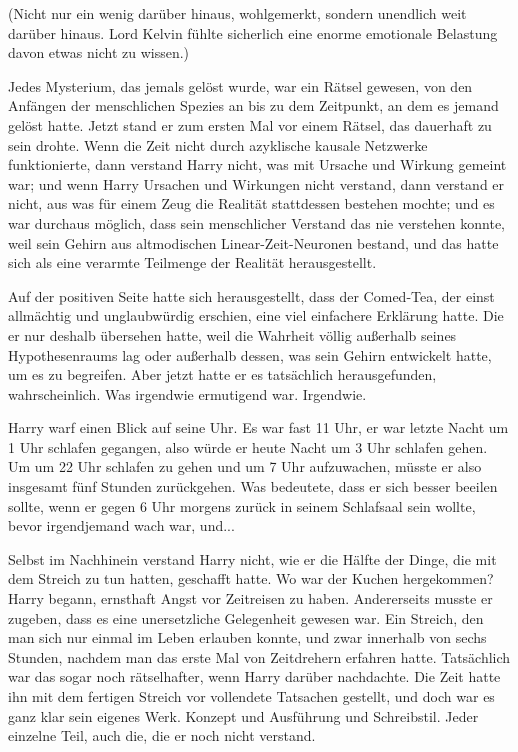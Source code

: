 (Nicht nur ein wenig darüber hinaus, wohlgemerkt, sondern unendlich weit darüber
hinaus. Lord Kelvin fühlte sicherlich eine enorme emotionale Belastung davon
etwas nicht zu wissen.)

Jedes Mysterium, das jemals gelöst wurde, war ein Rätsel gewesen, von den
Anfängen der menschlichen Spezies an bis zu dem Zeitpunkt, an dem es jemand
gelöst hatte. Jetzt stand er zum ersten Mal vor einem Rätsel, das dauerhaft zu
sein drohte. Wenn die Zeit nicht durch azyklische kausale Netzwerke
funktionierte, dann verstand Harry nicht, was mit Ursache und Wirkung gemeint
war; und wenn Harry Ursachen und Wirkungen nicht verstand, dann verstand er
nicht, aus was für einem Zeug die Realität stattdessen bestehen mochte; und es
war durchaus möglich, dass sein menschlicher Verstand das nie verstehen konnte,
weil sein Gehirn aus altmodischen Linear-Zeit-Neuronen bestand, und das hatte
sich als eine verarmte Teilmenge der Realität herausgestellt.

Auf der positiven Seite hatte sich herausgestellt, dass der Comed-Tea, der einst
allmächtig und unglaubwürdig erschien, eine viel einfachere Erklärung hatte. Die
er nur deshalb übersehen hatte, weil die Wahrheit völlig außerhalb seines
Hypothesenraums lag oder außerhalb dessen, was sein Gehirn entwickelt hatte, um
es zu begreifen. Aber jetzt hatte er es tatsächlich herausgefunden,
wahrscheinlich. Was irgendwie ermutigend war. Irgendwie.

Harry warf einen Blick auf seine Uhr. Es war fast 11 Uhr, er war letzte Nacht um
1 Uhr schlafen gegangen, also würde er heute Nacht um 3 Uhr schlafen gehen. Um
um 22 Uhr schlafen zu gehen und um 7 Uhr aufzuwachen, müsste er also insgesamt
fünf Stunden zurückgehen. Was bedeutete, dass er sich besser beeilen sollte,
wenn er gegen 6 Uhr morgens zurück in seinem Schlafsaal sein wollte, bevor
irgendjemand wach war, und...

Selbst im Nachhinein verstand Harry nicht, wie er die Hälfte der Dinge, die mit
dem Streich zu tun hatten, geschafft hatte. Wo war der Kuchen hergekommen? Harry
begann, ernsthaft Angst vor Zeitreisen zu haben. Andererseits musste er zugeben,
dass es eine unersetzliche Gelegenheit gewesen war. Ein Streich, den man sich
nur einmal im Leben erlauben konnte, und zwar innerhalb von sechs Stunden,
nachdem man das erste Mal von Zeitdrehern erfahren hatte. Tatsächlich war das
sogar noch rätselhafter, wenn Harry darüber nachdachte. Die Zeit hatte ihn mit
dem fertigen Streich vor vollendete Tatsachen gestellt, und doch war es ganz
klar sein eigenes Werk. Konzept und Ausführung und Schreibstil. Jeder einzelne
Teil, auch die, die er noch nicht verstand.

